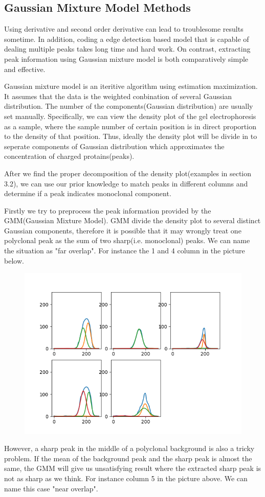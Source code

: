 \documentclass[12pt]{ctexart}
\begin{document}
\subsection{Gaussian Mixture Model Methods}
\par Using derivative and second order derivative can lead to troublesome results sometime. In addition, coding a edge detection based model that is capable of dealing multiple peaks takes long time and hard work. On contrast, extracting peak information using Gaussian mixture model is both comparatively simple and effective.
\par Gaussian mixture model is an iteritive algorithm using estimation maximization. It assumes that the data is the weighted conbination of several Gaussian distribution. The number of the components(Gaussian distribution) are usually set manually. Specifically, we can view the density plot of the gel electrophoresis as a sample, where the sample number of certain position is in direct proportion to the density of that position. Thus, ideally the density plot will be divide in to seperate components of Gaussian distribution which approximates the concentration of charged protains(peaks).
\par After we find the proper decomposition of the density plot(examples in section 3.2), we can use our prior knowledge to match peaks in different columns and determine if a peak indicates monoclonal component.
\par Firstly we try to preprocess the peak information provided by the GMM(Gaussian Mixture Model). GMM divide the density plot to several distinct Gaussian components, therefore it is possible that it may wrongly treat one polyclonal peak as the sum of two sharp(i.e. monoclonal) peaks. We can name the situation as "far overlap". For instance the 1 and 4 column in the picture below.
\begin{figure}[H]
    \centering
    \includegraphics[width=0.5\linewidth]{f.png}
\end{figure}
\par However, a sharp peak in the middle of a polyclonal background is also a tricky problem. If the mean of the background peak and the sharp peak is almost the same, the GMM will give us unsatisfying result where the extracted sharp peak is not as sharp as we think. For instance column 5 in the picture above. We can name this case "near overlap".
\end{document}
